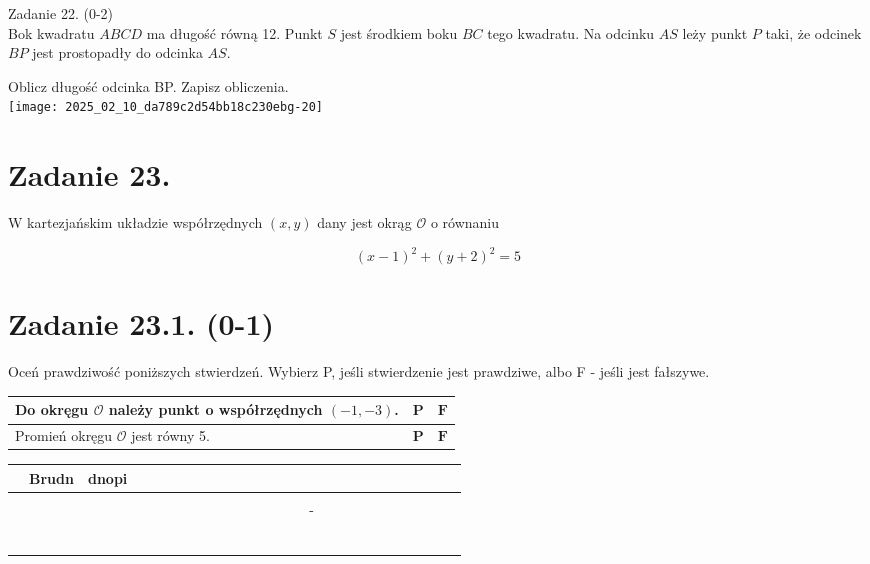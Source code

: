 \documentclass[10pt]{article}
\begin{document}
Zadanie 22. (0-2)\\
Bok kwadratu \(A B C D\) ma długość równą 12. Punkt \(S\) jest środkiem boku \(B C\) tego kwadratu. Na odcinku \(A S\) leży punkt \(P\) taki, że odcinek \(B P\) jest prostopadły do odcinka \(A S\).

Oblicz długość odcinka BP. Zapisz obliczenia.\\
\texttt{[image: 2025\_02\_10\_da789c2d54bb18c230ebg-20]}

\section*{Zadanie 23.}
W kartezjańskim układzie współrzędnych \((x, y)\) dany jest okrąg \(\mathcal{O}\) o równaniu

\[
(x-1)^{2}+(y+2)^{2}=5
\]

\section*{Zadanie 23.1. (0-1)}
Oceń prawdziwość poniższych stwierdzeń. Wybierz P, jeśli stwierdzenie jest prawdziwe, albo F - jeśli jest fałszywe.

\begin{center}
\begin{tabular}{|l|c|c|}
\hline
Do okręgu \(\mathcal{O}\) należy punkt o współrzędnych \((-1,-3)\). & \(\mathbf{P}\) & \(\mathbf{F}\) \\
\hline
Promień okręgu \(\mathcal{O}\) jest równy 5. & \(\mathbf{P}\) & \(\mathbf{F}\) \\
\hline
\end{tabular}
\end{center}

\begin{center}
\begin{tabular}{|c|c|c|c|c|c|c|c|c|c|c|c|c|c|c|c|c|c|c|c|c|c|c|c|c|c|}
\hline
 & Brudn & dnopi &  &  &  &  &  &  &  &  &  &  &  &  &  &  &  &  &  &  &  &  &  &  &  \\
\hline
 &  &  &  &  &  &  &  &  &  &  &  &  &  &  &  &  &  &  &  &  &  &  &  &  &  \\
\hline
 &  &  &  &  &  &  &  &  &  &  &  &  &  &  & - &  &  &  &  &  &  &  &  &  &  \\
\hline
 &  &  &  &  &  &  &  &  &  &  &  &  &  &  &  &  &  &  &  &  &  &  &  &  &  \\
\hline
 &  &  &  &  &  &  &  &  &  &  &  &  &  &  &  &  &  &  &  &  &  &  &  &  &  \\
\hline
 &  &  &  &  &  &  &  &  &  &  &  &  &  &  &  &  &  &  &  &  &  &  &  &  &  \\
\hline
 &  &  &  &  &  &  &  &  &  &  &  &  &  &  &  &  &  &  &  &  &  &  &  &  &  \\
\hline
 &  &  &  &  &  &  &  &  &  &  &  &  &  &  &  &  &  &  &  &  &  &  &  &  &  \\
\hline
 &  &  &  &  &  &  &  &  &  &  &  &  &  &  &  &  &  &  &  &  &  &  &  &  &  \\
\hline
\end{tabular}
\end{center}
\end{document}
